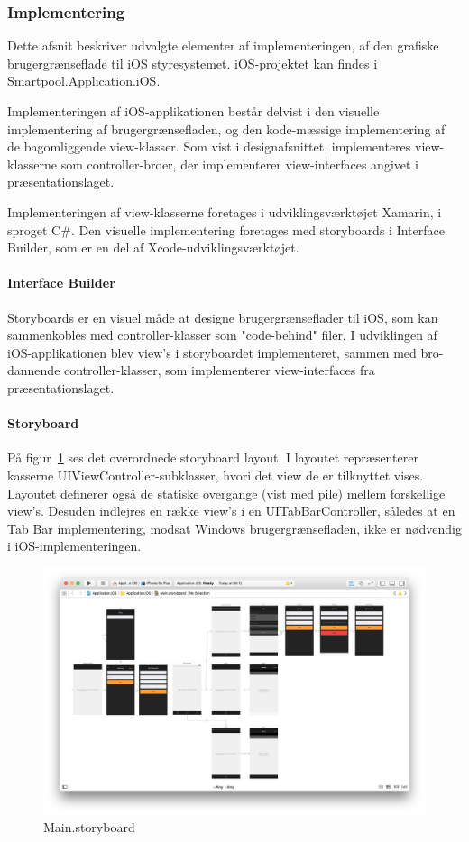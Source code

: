 \subsubsection{Implementering}
Dette afsnit beskriver udvalgte elementer af implementeringen, af den grafiske brugergrænseflade til iOS styresystemet. iOS-projektet kan findes i Smartpool.Application.iOS.

Implementeringen af iOS-applikationen består delvist i den visuelle implementering af brugergrænsefladen, og den kode-mæssige implementering af de bagomliggende view-klasser. Som vist i designafsnittet, implementeres view-klasserne som controller-broer, der implementerer view-interfaces angivet i præsentationslaget.

Implementeringen af view-klasserne foretages i udviklingsværktøjet Xamarin, i sproget C\#. Den visuelle implementering foretages med storyboards i Interface Builder, som er en del af Xcode-udviklingsværktøjet.

\paragraph{Interface Builder}
Storyboards er en visuel måde at designe brugergrænseflader til iOS, som kan sammenkobles med controller-klasser som "code-behind" filer. I udviklingen af iOS-applikationen blev view's i storyboardet implementeret, sammen med bro-dannende controller-klasser, som implementerer view-interfaces fra præsentationslaget.

\paragraph{Storyboard}
På figur~\ref{fig:iosstoryboard} ses det overordnede storyboard layout. I layoutet repræsenterer kasserne UIViewController-subklasser, hvori det view de er tilknyttet vises. Layoutet definerer også de statiske overgange (vist med pile) mellem forskellige view's. Desuden indlejres en række view's i en UITabBarController, således at en Tab Bar implementering, modsat Windows brugergrænsefladen, ikke er nødvendig i iOS-implementeringen.

\begin{figure}
	\centering
	\includegraphics[width=1.0\linewidth]{figs/implementering/ios_imp_storyboard}
	\caption{Main.storyboard}
	\label{fig:iosstoryboard}
\end{figure}

